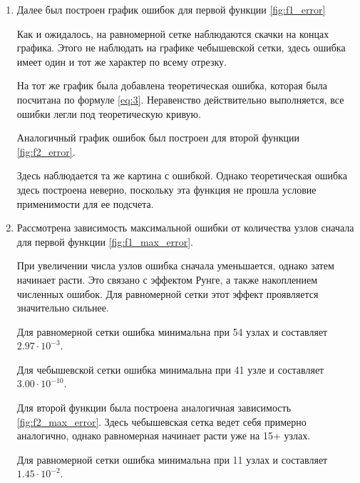 \documentclass[14pt]{extarticle}
\begin{document}
\begin{enumerate}[label*=\arabic*), align=left, leftmargin=*, itemindent=1.5em, listparindent=1.5em, parsep=0pt]
		Интерполяционный полином при малых узлах почти совпадает с исходной функцией. В связи с этим графики накладываются друг на друга. Ошибку нужно рассматривать на другом графике
		
		Построены изначальные полиномы для второй функции и сама функция \eqref{fig:f2}.
		
		Аналогично для второй функции. Хотя здесь уже и наблюдаются различия, но они минимальны чтобы делать выводы.\\
		
		\item Далее был построен график ошибок для первой функции \eqref{fig:f1_error} 
		
		Как и ожидалось, на равномерной сетке наблюдаются скачки на концах графика. Этого не наблюдать на графике чебышевской сетки, здесь ошибка имеет один и тот же характер по всему отрезку.
		
		На тот же график была добавлена теоретическая ошибка, которая была посчитана по формуле \eqref{eq:3}. Неравенство действительно выполняется, все ошибки легли под теоретическую кривую.
		
		Аналогичный график ошибок был построен для второй функции \eqref{fig:f2_error}.
		
		Здесь наблюдается та же картина с ошибкой. Однако теоретическая ошибка здесь построена неверно, поскольку эта функция не прошла условие применимости для ее подсчета.\\

		\item Рассмотрена зависимость максимальной ошибки от количества узлов сначала для первой функции \eqref{fig:f1_max_error}.
		
		При увеличении числа узлов ошибка сначала уменьшается, однако затем начинает расти. Это связано с эффектом Рунге, а также накоплением численных ошибок. Для равномерной сетки этот эффект проявляется значительно сильнее.
		
		Для равномерной сетки ошибка минимальна при 54 узлах и составляет $2.97 \cdot 10^{-3}$.
		
		Для чебышевской сетки ошибка минимальна при 41 узле и составляет $3.00 \cdot 10^{-10}$.

		Для второй функции была построена аналогичная зависимость \eqref{fig:f2_max_error}. Здесь чебышевская сетка ведет себя примерно аналогично, однако равномерная начинает расти уже на 15+ узлах.
		
		Для равномерной сетки ошибка минимальна при 11 узлах и составляет $1.45 \cdot 10^{-2}$.
		

\end{enumerate}
\end{document}
